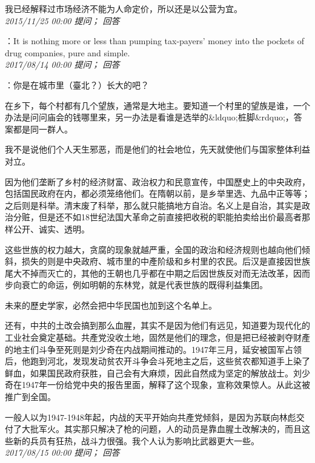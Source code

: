 \documentclass[twocolumn]{ctexart}
\begin{document}
我已经解释过市场经济不能为人命定价，所以还是以公营为宜。\\

\textit{\hfill\noindent\small 2015/11/25 00:00 提问； 回答}

：It is nothing more or less than pumping tax-payers' money into the pockets of drug companies, pure and simple.\\

\textit{\hfill\noindent\small 2017/08/14 00:00 提问； 回答}

：你是在城市里（臺北？）长大的吧？

在乡下，每个村都有几个望族，通常是大地主。要知道一个村里的望族是谁，一个办法是问问庙会的钱哪里来，另一办法是看谁是选举的\&ldquo;桩脚\&rdquo;，答案都是同一群人。

我不是说他们个人天生邪恶，而是他们的社会地位，先天就使他们与国家整体利益对立。

因为他们垄断了乡村的经济财富、政治权力和民意宣传，中国歷史上的中央政府，包括国民政府在内，都必须笼络他们。在隋朝以前，是乡举里选、九品中正等等；之后则是科举。清末废了科举，那么就只能搞地方自治。名义上是自治，其实是政治分赃，但是还不如18世纪法国大革命之前直接把收税的职能拍卖给出价最高者那样公开、诚实、透明。

这些世族的权力越大，贪腐的现象就越严重，全国的政治和经济规则也越向他们倾斜，损失的则是中央政府、城市里的中產阶级和乡村里的农民。后汉是直接因世族尾大不掉而灭亡的，其他的王朝也几乎都在中期之后因世族反对而无法改革，因而步向衰亡的命运，例如明朝的东林党，就是代表世族的既得利益集团。

未来的歷史学家，必然会把中华民国也加到这个名单上。

还有，中共的土改会搞到那么血腥，其实不是因为他们有远见，知道要为现代化的工业社会奠定基础。共產党没收土地，固然是他们的理念，但是把已经被剥夺财產的地主们斗争至死则是刘少奇在内战期间推动的。1947年三月，延安被国军占领后，他跑到河北，发现发动贫农开斗争会斗死地主之后，这些贫农都知道手上染了鲜血，如果国民政府获胜，自己会有大麻烦，因此自然成为坚定的解放战士。刘少奇在1947年一份给党中央的报告里面，解释了这个现象，宣称效果惊人。从此这被推广到全国。

一般人以为1947-1948年起，内战的天平开始向共產党倾斜，是因为苏联向林彪交付了大批军火。其实那只解决了枪的问题，人的动员是靠血腥土改解决的，而且这些新的兵员有狂热，战斗力很强。我个人认为影响比武器更大一些。\\

\textit{\hfill\noindent\small 2017/08/15 00:00 提问； 回答}
\end{document}
